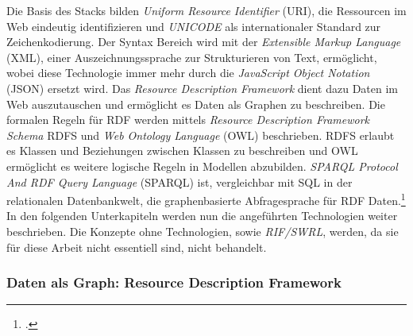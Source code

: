 \documentclass[12pt,a4paper]{article}
\begin{document}
Die Basis des Stacks bilden \textit{Uniform Resource Identifier} (URI), die Ressourcen im Web eindeutig identifizieren und \textit{UNICODE} als internationaler Standard zur Zeichenkodierung. Der Syntax Bereich wird mit der \textit{Extensible Markup Language} (XML), einer Auszeichnungssprache zur Strukturieren von Text, ermöglicht, wobei diese Technologie immer mehr durch die \textit{JavaScript Object Notation} (JSON) ersetzt wird. Das \textit{Resource Description Framework} dient dazu Daten im Web auszutauschen und ermöglicht es Daten als Graphen zu beschreiben. Die formalen Regeln für RDF werden mittels \textit{Resource Description Framework Schema} RDFS und \textit{Web Ontology Language} (OWL) beschrieben. RDFS erlaubt es Klassen und Beziehungen zwischen Klassen zu beschreiben und OWL ermöglicht es weitere logische Regeln in Modellen abzubilden. \textit{SPARQL Protocol And RDF Query Language} (SPARQL) ist, vergleichbar mit SQL in der relationalen Datenbankwelt, die graphenbasierte Abfragesprache für RDF Daten.\footcite[][]{horrocks2005semantic}
\\
In den folgenden Unterkapiteln werden nun die angeführten Technologien weiter beschrieben. Die Konzepte ohne Technologien, sowie \textit{RIF/SWRL}, werden, da sie für diese Arbeit nicht essentiell sind, nicht behandelt.


\subsubsection{Daten als Graph: Resource Description Framework}
\end{document}
